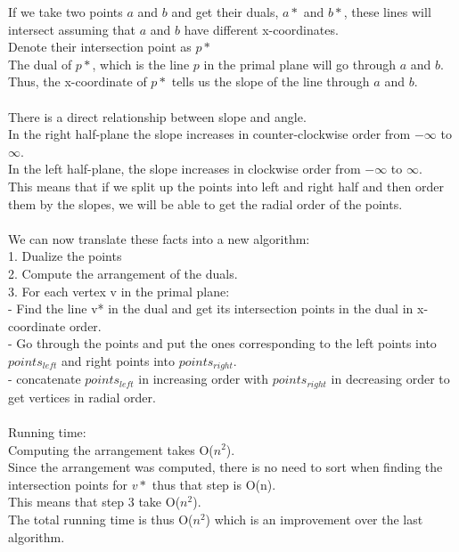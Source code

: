\documentclass[11pt,psfig]{article}
\begin{document}
If we take two points $a$ and $b$ and get their duals, $a*$ and $b*$, these lines will intersect assuming that $a$ and $b$ have different x-coordinates. \\
Denote their intersection point as $p*$\\
The dual of $p*$, which is the line $p$ in the primal plane will go through $a$ and $b$. \\
Thus, the x-coordinate of $p*$ tells us the slope of the line through $a$ and $b$. \\
\\
There is a direct relationship between slope and angle. \\
In the right half-plane the slope increases in counter-clockwise order from $-\infty$ to $\infty$. \\
In the left half-plane, the slope increases in clockwise order from $-\infty$ to $\infty$. \\
This means that if we split up the points into left and right half and then order them by the slopes, we will be able to get the radial order of the points. \\
\\
We can now translate these facts into a new algorithm:\\
1. Dualize the points\\
2. Compute the arrangement of the duals. \\
3. For each vertex v in the primal plane:\\
- Find the line v* in the dual and get its intersection points in the dual in x-coordinate order. \\
- Go through the points and put the ones corresponding to the left points into $points_{left}$ and right points into $points_{right}$. \\
- concatenate $points_{left}$ in increasing order with $points_{right}$ in decreasing order to get vertices in radial order. \\
\\
Running time:\\
Computing the arrangement takes O($n^2$). \\
Since the arrangement was computed, there is no need to sort when finding the intersection points for $v*$ thus that step is O(n). \\
This means that step 3 take O($n^2$). \\
The total running time is thus O($n^2$) which is an improvement over the last algorithm. 


\newpage
\end{document}

